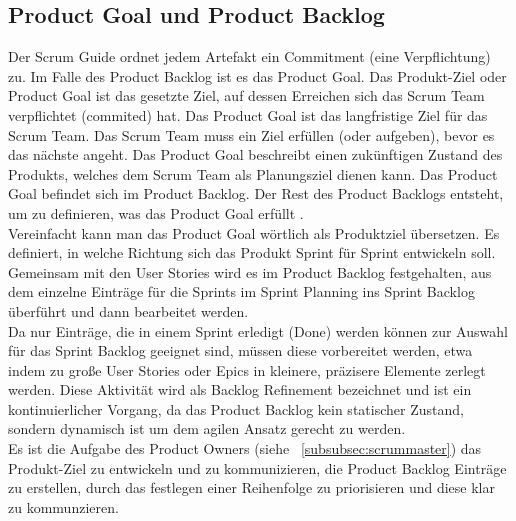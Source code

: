 \subsection{Product Goal und Product Backlog}
\label{subsec:productGoalBacklog}

Der Scrum Guide ordnet jedem Artefakt ein Commitment (eine Verpflichtung) zu. Im Falle des Product Backlog ist es das Product Goal. Das Produkt-Ziel oder Product Goal ist das gesetzte Ziel, auf dessen Erreichen sich das Scrum Team verpflichtet (commited) hat.  Das Product Goal ist das langfristige Ziel für das Scrum Team. Das Scrum Team muss ein Ziel erfüllen (oder aufgeben), bevor es das nächste angeht. Das Product Goal beschreibt einen zukünftigen Zustand des Produkts, welches dem Scrum Team als Planungsziel dienen kann. Das Product Goal befindet sich im Product Backlog. Der Rest des Product Backlogs entsteht, um zu definieren, was das Product Goal erfüllt  \cite{ScrumGuide}.\\



Vereinfacht kann man das Product Goal wörtlich als Produktziel übersetzen. Es definiert, in welche Richtung sich das Produkt Sprint für Sprint entwickeln soll. Gemeinsam mit den User Stories wird es im Product Backlog festgehalten, aus dem einzelne Einträge für die Sprints im Sprint Planning ins Sprint Backlog überführt und dann bearbeitet werden.\\

Da nur Einträge, die in einem Sprint erledigt (Done) werden können zur Auswahl für das Sprint Backlog geeignet sind, müssen diese vorbereitet werden, etwa indem zu große User Stories oder Epics in kleinere, präzisere Elemente zerlegt werden. Diese Aktivität wird als Backlog Refinement bezeichnet und ist ein kontinuierlicher Vorgang, da das Product Backlog kein statischer Zustand, sondern dynamisch ist um dem agilen Ansatz gerecht zu werden.\\

Es ist die Aufgabe des Product Owners (siehe ~\ref{subsubsec:scrummaster}) das Produkt-Ziel zu entwickeln und zu kommunizieren, die Product Backlog Einträge zu erstellen, durch das festlegen einer Reihenfolge zu priorisieren und diese klar zu kommunzieren.\\

